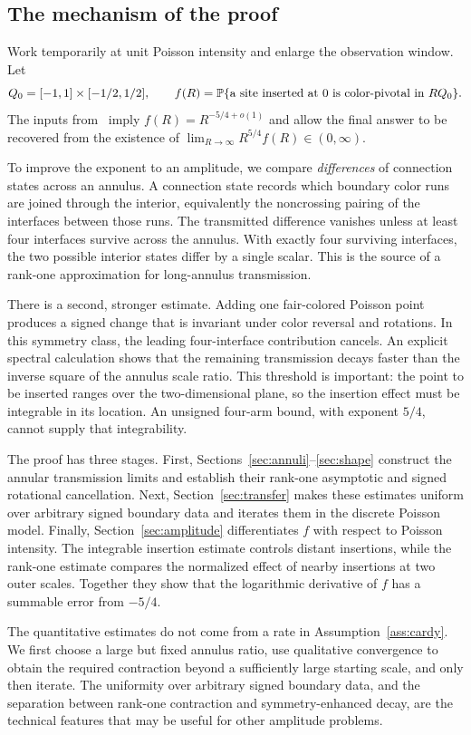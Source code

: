 \subsection{The mechanism of the proof}
Work temporarily at unit Poisson intensity and enlarge the observation
window. Let
\[
 Q_0=[-1,1]\times[-1/2,1/2],\qquad
 f(R)=\mathbb P\{\text{a site inserted at $0$ is color-pivotal in $RQ_0$}\}.
\]
The inputs from~\cite{V} imply $f(R)=R^{-5/4+o(1)}$ and allow the final
answer to be recovered from the existence of
$\lim_{R\to\infty}R^{5/4}f(R)\in(0,\infty)$.

To improve the exponent to an amplitude, we compare \emph{differences}
of connection states across an annulus. A connection state records
which boundary color runs are joined through the interior, equivalently
the noncrossing pairing of the interfaces between those runs. The
transmitted difference vanishes unless at least four interfaces survive
across the annulus. With exactly four surviving interfaces, the two
possible interior states differ by a single scalar. This is the
source of a rank-one approximation for long-annulus transmission.

There is a second, stronger estimate. Adding one fair-colored Poisson
point produces a signed change that is invariant under color reversal
and rotations. In this symmetry class, the leading four-interface
contribution cancels. An explicit spectral calculation shows that the
remaining transmission decays faster than the inverse square of the
annulus scale ratio. This threshold is important: the point to be
inserted ranges over the two-dimensional plane, so the insertion
effect must be integrable in its location. An unsigned four-arm bound,
with exponent $5/4$, cannot supply that integrability.

The proof has three stages. First, Sections~\ref{sec:annuli}--\ref{sec:shape}
construct the annular transmission limits and establish their
rank-one asymptotic and signed rotational cancellation. Next,
Section~\ref{sec:transfer} makes these estimates uniform over arbitrary
signed boundary data and iterates them in the discrete Poisson model.
Finally, Section~\ref{sec:amplitude} differentiates $f$ with respect to
Poisson intensity. The integrable insertion estimate controls distant
insertions, while the rank-one estimate compares the normalized effect
of nearby insertions at two outer scales. Together they show that the
logarithmic derivative of $f$ has a summable error from $-5/4$.

The quantitative estimates do not come from a rate in
Assumption~\ref{ass:cardy}. We first choose a large but fixed annulus
ratio, use qualitative convergence to obtain the required contraction
beyond a sufficiently large starting scale, and only then iterate.
The uniformity over arbitrary signed boundary data, and the separation
between rank-one contraction and symmetry-enhanced decay, are the
technical features that may be useful for other amplitude problems.
